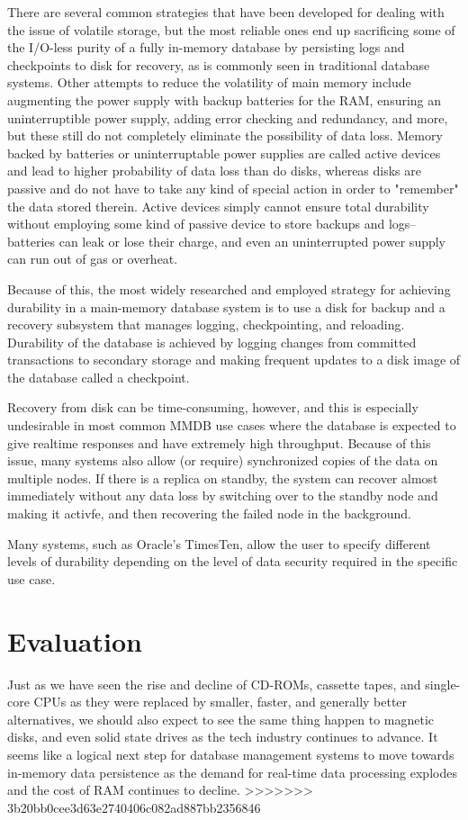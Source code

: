 \documentclass[11pt,a4paper]{report}
\begin{document}
There are several common strategies that have been developed for dealing with the issue of volatile storage, but the most reliable ones end up sacrificing some of the I/O-less purity of a fully in-memory database by persisting logs and checkpoints to disk for recovery, as is commonly seen in traditional database systems. Other attempts to reduce the volatility of main memory include augmenting the power supply with backup batteries for the RAM, ensuring an uninterruptible power supply, adding error checking and redundancy, and more, but these still do not completely eliminate the possibility of data loss. Memory backed by batteries or uninterruptable power supplies are called active devices and lead to higher probability of data loss than do disks, whereas disks are passive and do not have to take any kind of special action in order to "remember" the data stored therein. Active devices simply cannot ensure total durability without employing some kind of passive device to store backups and logs--batteries can leak or lose their charge, and even an uninterrupted power supply can run out of gas or overheat.\cite{garcia1992main}

Because of this, the most widely researched and employed strategy for achieving durability in a main-memory database system is to use a disk for backup and a recovery subsystem that manages logging, checkpointing, and reloading.\cite{raja2006comparative} Durability of the database is achieved by logging changes from committed transactions to secondary storage and making frequent updates to a disk image of the database called a checkpoint.

Recovery from disk can be time-consuming, however, and this is especially undesirable in most common MMDB use cases where the database is expected to give realtime responses and have extremely high throughput. Because of this issue, many systems also allow (or require) synchronized copies of the data on multiple nodes. If there is a replica on standby, the system can recover almost immediately without any data loss by switching over to the standby node and making it activfe, and then recovering the failed node in the background.\cite{deshmukhreview}

Many systems, such as Oracle's TimesTen, allow the user to specify different levels of durability depending on the level of data security required in the specific use case.\cite{raja2006comparative} 



\section{Evaluation}
Just as we have seen the rise and decline of CD-ROMs, cassette tapes, and single-core CPUs as they were replaced by smaller, faster, and generally better alternatives, we should also expect to see the same thing happen to magnetic disks, and even solid state drives as the tech industry continues to advance. It seems like a logical next step for database management systems to move towards in-memory data persistence as the demand for real-time data processing explodes and the cost of RAM continues to decline. 
>>>>>>> 3b20bb0cee3d63e2740406c082ad887bb2356846
\end{document}
